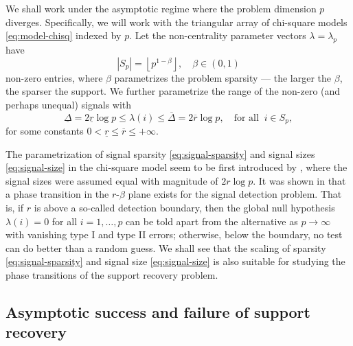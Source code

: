 
We shall work under the asymptotic regime where the problem dimension $p$ diverges.
Specifically, we will work with the triangular array of chi-square models \eqref{eq:model-chisq} indexed by $p$.
Let the non-centrality parameter vectors $\lambda = \lambda_p$ have 
\begin{equation} \label{eq:signal-sparsity}
    |S_p| = \left\lfloor p^{1-\beta} \right\rfloor, \quad \beta\in(0,1)
\end{equation}
non-zero entries, where $\beta$ parametrizes the problem sparsity --- the larger the $\beta$, the sparser the support.
We further parametrize the range of the non-zero (and perhaps unequal) signals with
\begin{equation} \label{eq:signal-size}
    \underline{\Delta} = 2\underline{r}\log{p}
    \le \lambda(i) \le
    \overline{\Delta} = 2\overline{r}\log{p}, \quad \text{for all}\;\;i\in S_p,
\end{equation}
for some constants $0<\underline{r}\le\overline{r}\le+\infty$.

\begin{remark}
The parametrization of signal sparsity \eqref{eq:signal-sparsity} and signal sizes  \eqref{eq:signal-size} in the chi-square model seem to be first introduced by \citet{donoho2004higher}, where the signal sizes were assumed equal with magnitude of $2{r}\log{p}$.
It was shown in \cite{donoho2004higher} that a phase transition in the $r$-$\beta$ plane exists for the signal detection problem. 
That is, if $r$ is above a so-called detection boundary, then the global null hypothesis $\lambda(i)=0$ for all $i=1,\ldots,p$ can be told apart from the alternative as $p\to\infty$ with vanishing type I and type II errors; 
otherwise, below the boundary, no test can do better than a random guess.
We shall see that the scaling of sparsity \eqref{eq:signal-sparsity} and signal size \eqref{eq:signal-size} is also suitable for studying the phase transitions of the support recovery problem.
\end{remark}


\subsection{Asymptotic success and failure of support recovery}

